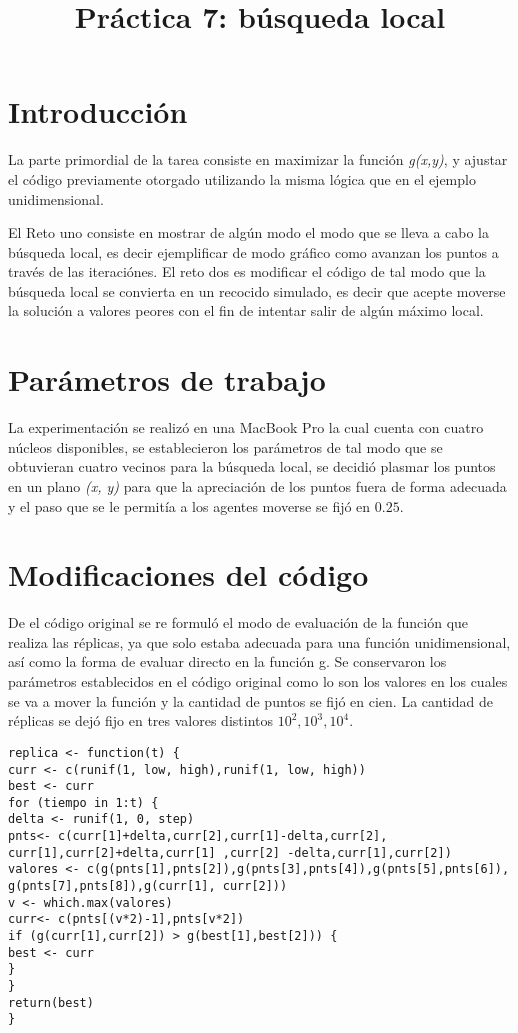 \documentclass[a4paper]{article}
\title{Práctica 7: búsqueda local}
\begin{document}
\maketitle

\section{Introducci\'on}
La parte primordial de la tarea consiste en maximizar la función \textit{g(x,y)}, y ajustar el código previamente otorgado utilizando la misma lógica que en el ejemplo unidimensional.

El Reto uno consiste en mostrar de algún modo el modo que se lleva a cabo la búsqueda local, es decir ejemplificar de modo gráfico como avanzan los puntos a través de las iteraciónes. El reto dos es modificar el código de tal modo que la búsqueda local se convierta en un recocido simulado, es decir que acepte moverse la solución a valores peores con el fin de intentar salir de algún máximo local.


\section{Par\'ametros de trabajo}
La experimentación se realizó en una MacBook Pro la cual cuenta con cuatro núcleos disponibles, se establecieron los parámetros de tal modo que se obtuvieran cuatro vecinos para la búsqueda local, se decidió plasmar los puntos en un plano \textit{(x, y)} para que la apreciación de los puntos fuera de forma adecuada y el paso que se le permitía a los agentes moverse se fijó en $0.25$.


\section{Modificaciones del código}
De el código original se  re formuló el modo de evaluación de la función que realiza las réplicas, ya que solo estaba adecuada para una función unidimensional, así como la forma de evaluar directo en la función g. Se conservaron los parámetros establecidos en el código original como lo son los valores en los cuales se va a mover la función y la cantidad de puntos se fijó en cien. La cantidad de réplicas se dejó fijo en tres valores distintos $10^2,10^3,10^4$. 


\begin{lstlisting}[frame=single]
replica <- function(t) {
curr <- c(runif(1, low, high),runif(1, low, high))
best <- curr
for (tiempo in 1:t) {
delta <- runif(1, 0, step)
pnts<- c(curr[1]+delta,curr[2],curr[1]-delta,curr[2],
curr[1],curr[2]+delta,curr[1] ,curr[2] -delta,curr[1],curr[2])
valores <- c(g(pnts[1],pnts[2]),g(pnts[3],pnts[4]),g(pnts[5],pnts[6]),
g(pnts[7],pnts[8]),g(curr[1], curr[2]))
v <- which.max(valores)
curr<- c(pnts[(v*2)-1],pnts[v*2])
if (g(curr[1],curr[2]) > g(best[1],best[2])) {
best <- curr
}
}
return(best)
} 
\end{lstlisting}
\end{document}
